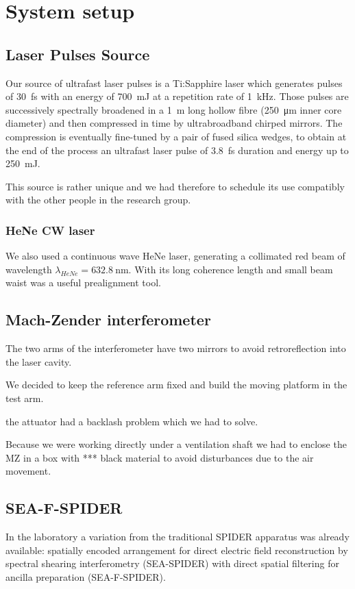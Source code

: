 \documentclass[12pt,a4paper,twoside]{article}
\begin{document}
\section{System setup}
\subsection{Laser Pulses Source}
Our source of ultrafast laser pulses is a Ti:Sapphire laser which generates pulses of \SI{30}{\fs} with an energy of \SI{700}{\milli\J} at a repetition rate of \SI{1}{\kHz}.
Those pulses are successively spectrally broadened in a \SI{1}{\m} long hollow fibre (\SI{250}{\um} inner core diameter) and then compressed in time by ultrabroadband chirped mirrors.
The compression is eventually fine-tuned by a pair of fused silica wedges, to obtain at the end of the process an ultrafast laser pulse of \SI{3.8}{\fs} duration and energy up to \SI{250}{\milli\J}.

This source is rather unique and we had therefore to schedule its use compatibly with the other people in the research group.

\subsubsection{HeNe CW laser}
We also used a continuous wave HeNe laser, generating a collimated red beam of wavelength $\lambda_{HeNe}=\SI{632.8}{\nm}$.
With its long coherence length and small beam waist was a useful prealignment tool.
\clearpage
\subsection{Mach-Zender interferometer}


The two arms of the interferometer have two mirrors to avoid retroreflection into the laser cavity.

We decided to keep the reference arm fixed and build the moving platform in the test arm.

the attuator had a backlash problem which we had to solve.

Because we were working directly under a ventilation shaft we had to enclose the MZ in a box with *** black material to avoid disturbances due to the air movement.

\subsection{SEA-F-SPIDER}
In the laboratory a variation from the traditional SPIDER apparatus was already available: spatially encoded arrangement for direct electric field reconstruction by spectral shearing interferometry (SEA-SPIDER) with direct spatial filtering for ancilla preparation (SEA-F-SPIDER).
\end{document}
